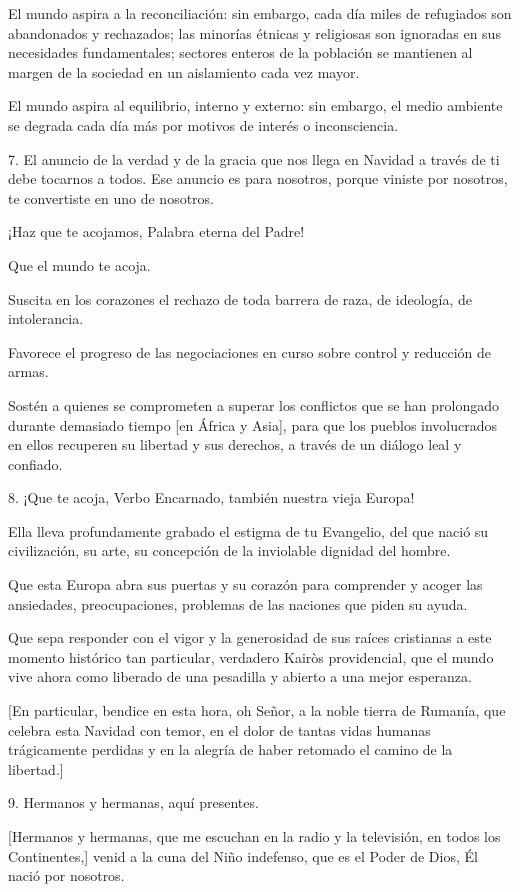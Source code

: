 El mundo aspira a la reconciliación: sin embargo, cada día miles de
refugiados son abandonados y rechazados; las minorías étnicas y
religiosas son ignoradas en sus necesidades fundamentales; sectores
enteros de la población se mantienen al margen de la sociedad en un
aislamiento cada vez mayor.

El mundo aspira al equilibrio, interno y externo: sin embargo, el medio
ambiente se degrada cada día más por motivos de interés o inconsciencia.

7. El anuncio de la verdad y de la gracia que nos llega en Navidad a
través de ti debe tocarnos a todos. Ese anuncio es para nosotros, porque
viniste por nosotros, te convertiste en uno de nosotros.

¡Haz que te acojamos, Palabra eterna del Padre!

Que el mundo te acoja.

Suscita en los corazones el rechazo de toda barrera de raza, de
ideología, de intolerancia.

Favorece el progreso de las negociaciones en curso sobre control y
reducción de armas.

Sostén a quienes se comprometen a superar los conflictos que se han
prolongado durante demasiado tiempo {[}en África y Asia{]}, para que los
pueblos involucrados en ellos recuperen su libertad y sus derechos, a
través de un diálogo leal y confiado.

8. ¡Que te acoja, Verbo Encarnado, también nuestra vieja Europa!

Ella lleva profundamente grabado el estigma de tu Evangelio, del que
nació su civilización, su arte, su concepción de la inviolable dignidad
del hombre.

Que esta Europa abra sus puertas y su corazón para comprender y acoger
las ansiedades, preocupaciones, problemas de las naciones que piden su
ayuda.

Que sepa responder con el vigor y la generosidad de sus raíces
cristianas a este momento histórico tan particular, verdadero Kairòs
providencial, que el mundo vive ahora como liberado de una pesadilla y
abierto a una mejor esperanza.

{[}En particular, bendice en esta hora, oh Señor, a la noble tierra de
Rumanía, que celebra esta Navidad con temor, en el dolor de tantas vidas
humanas trágicamente perdidas y en la alegría de haber retomado el
camino de la libertad.{]}

9. Hermanos y hermanas, aquí presentes.

{[}Hermanos y hermanas, que me escuchan en la radio y la televisión, en
todos los Continentes,{]} venid a la cuna del Niño indefenso, que es el
Poder de Dios, Él nació por nosotros.

